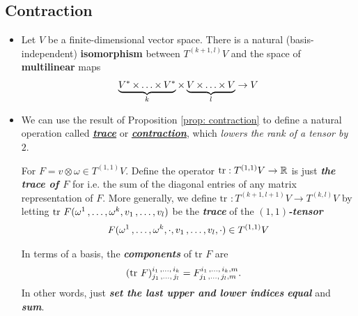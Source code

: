 \documentclass[11pt]{article}
\begin{document}
\subsection{Contraction}
\begin{itemize}
\item \begin{proposition} \label{prop: contraction}
Let $V$ be a finite-dimensional vector space. There is a natural (basis-independent) \textbf{isomorphism} between $T^{(k+1, l)}V$ and the space of \textbf{multilinear}
maps
\begin{align*}
\underbrace{V^{*} \,{\times}\ldots{\times}\, V^{*}}_{k} \times \underbrace{V \,{\times}\ldots{\times}\, V}_{l} \rightarrow V
\end{align*}
\end{proposition}


\item \begin{definition}
We can use the result of Proposition \ref{prop: contraction} to define a natural operation called \underline{\emph{\textbf{trace}}} or \underline{\emph{\textbf{contraction}}}, which \emph{lowers the rank of a tensor by $2$}. 

For $F = v\otimes \omega \in T^{(1,1)}V$.  Define the operator $\text{tr}: T^{(1,1)}V  \rightarrow {\mathbb R}$ is just \emph{\textbf{the trace of $F$}} for  i.e. the sum of the diagonal entries of any matrix representation of $F$. More generally, we define $\text{tr }: T^{(k+1, l+1)}V  \rightarrow T^{(k,l)}V$ by letting $\text{tr }F(\omega^1 \,{,}\ldots{,}\, \omega^k, v_1 \,{,}\ldots{,}\, v_l)$ be the \emph{\textbf{trace}} of the \emph{\textbf{$(1,1)$-tensor}}
\begin{align*}
F(\omega^1 \,{,}\ldots{,}\, \omega^k, \cdot, v_1 \,{,}\ldots{,}\, v_l, \cdot)  \in T^{(1,1)}V
\end{align*}

In terms of a basis, the \emph{\textbf{components}} of $\text{tr }F$ are
\begin{align*}
(\text{tr }F)_{j_1 \,{,}\ldots{,}\, j_l}^{i_1 \,{,}\ldots{,}\, i_k} &= F_{j_1 \,{,}\ldots{,}\, j_l, m}^{i_1 \,{,}\ldots{,}\, i_k, m}.
\end{align*} In other words, just \emph{\textbf{set the last upper and lower indices} \textbf{equal}} and \textbf{\emph{sum}}.
\end{definition}


\end{itemize}
\end{document}
